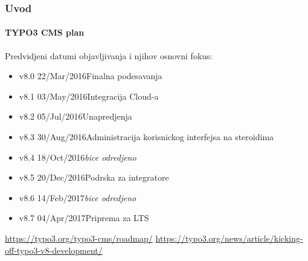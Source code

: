 \begin{frame}[fragile]
	\frametitle{Uvod}
	\framesubtitle{TYPO3 CMS plan}

	Predvidjeni datumi objavljivanja i njihov osnovni fokus:

	\begin{itemize}

		\item v8.0 \tabto{1.1cm}22/Mar/2016\tabto{3.4cm}Finalna podesavanja
		\item v8.1 \tabto{1.1cm}03/May/2016\tabto{3.4cm}Integracija Cloud-a
		\item
			\begingroup
				\color{typo3orange}
					v8.2 \tabto{1.1cm}05/Jul/2016\tabto{3.4cm}Unapredjenja
			\endgroup
		\item
			\begingroup
				\color{typo3orange}
					v8.3 \tabto{1.1cm}30/Aug/2016\tabto{3.4cm}Administracija korisnickog interfejsa na steroidima
			\endgroup
		\item v8.4 \tabto{1.1cm}18/Oct/2016\tabto{3.4cm}\textit{bice odredjeno}
		\item v8.5 \tabto{1.1cm}20/Dec/2016\tabto{3.4cm}Podrska za integratore
		\item v8.6 \tabto{1.1cm}14/Feb/2017\tabto{3.4cm}\textit{bice odredjeno}
		\item v8.7 \tabto{1.1cm}04/Apr/2017\tabto{3.4cm}Priprema za LTS

	\end{itemize}

	\smaller
		\url{https://typo3.org/typo3-cms/roadmap/}\newline
		\url{https://typo3.org/news/article/kicking-off-typo3-v8-development/}
	\normalsize

\end{frame}

